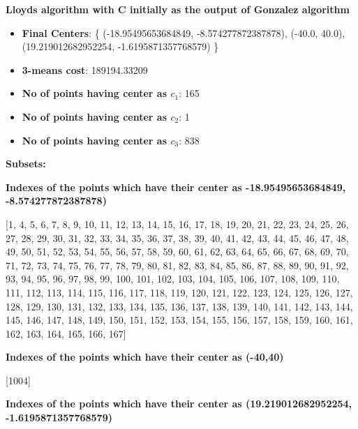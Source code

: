 \documentclass[11pt]{article}
\begin{document}
\begin{itemize}
\textbf{ Lloyds algorithm with C initially as the output of Gonzalez algorithm }\\
\begin{itemize}
	\item[] \textbf{Final Centers}: \{ (-18.95495653684849, -8.574277872387878), (-40.0, 40.0), (19.219012682952254, -1.6195871357768579)    \}
    	\item[] \textbf{3-means cost}: 189194.33209
    	\item[] \textbf{No of points having center as $c_1$}: 165
    	\item[] \textbf{No of points having center as $c_2$}: 1 
    	\item[] \textbf{No of points having center as $c_3$}: 838
    	\end{itemize}
    	
    	\textbf{Subsets:}
    	
    	\textbf{Indexes of the points which have their center as  -18.95495653684849, -8.574277872387878)}
    	
    	[1, 4, 5, 6, 7, 8, 9, 10, 11, 12, 13, 14, 15, 16, 17, 18, 19, 20, 21, 22, 23, 24, 25, 26, 27, 28, 29, 30, 31, 32, 33, 34, 35, 36, 37, 38, 39, 40, 41, 42, 43, 44, 45, 46, 47, 48, 49, 50, 51, 52, 53, 54, 55, 56, 57, 58, 59, 60, 61, 62, 63, 64, 65, 66, 67, 68, 69, 70, 71, 72, 73, 74, 75, 76, 77, 78, 79, 80, 81, 82, 83, 84, 85, 86, 87, 88, 89, 90, 91, 92, 93, 94, 95, 96, 97, 98, 99, 100, 101, 102, 103, 104, 105, 106, 107, 108, 109, 110, 111, 112, 113, 114, 115, 116, 117, 118, 119, 120, 121, 122, 123, 124, 125, 126, 127, 128, 129, 130, 131, 132, 133, 134, 135, 136, 137, 138, 139, 140, 141, 142, 143, 144, 145, 146, 147, 148, 149, 150, 151, 152, 153, 154, 155, 156, 157, 158, 159, 160, 161, 162, 163, 164, 165, 166, 167]
    	
    	\textbf{Indexes of the points which have their center as  (-40,40)}
    	
    	 [1004]
    	 
    	 \textbf{Indexes of the points which have their center as  (19.219012682952254, -1.6195871357768579) }
    	 

\end{itemize}
\end{document}
